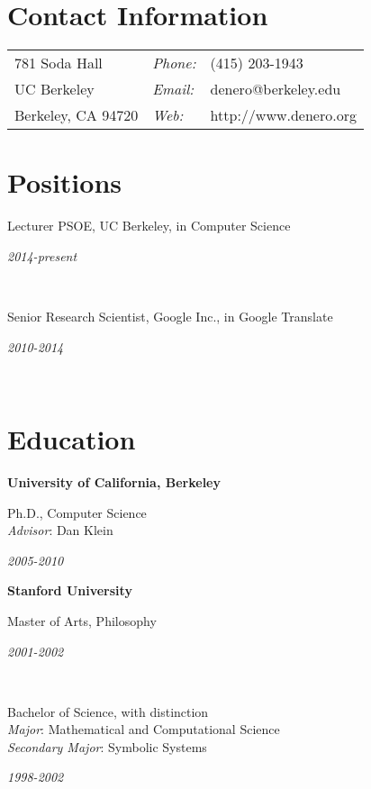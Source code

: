 \documentclass[margin,line]{res}
\newcommand{\dated}[2]{\parbox[t]{4.4in}{#1} \hspace{0.4in}
											 \parbox[t]{1in}{ {\it #2 } } }
\begin{document}

\begin{resume}

\section{\sc Contact Information}
\vspace{.05in}
\begin{tabular}{@{}p{2in}lp{4in}}
781 Soda Hall         & {\it Phone:} & (415) 203-1943        \\
UC Berkeley           & {\it Email:} & denero@berkeley.edu   \\
Berkeley, CA  94720   & {\it Web:}   & http://www.denero.org \\
\end{tabular}

\section{\sc Positions}

	\dated{Lecturer PSOE, UC Berkeley, in Computer Science}
	{ 2014-present } \\

	\dated{Senior Research Scientist, Google Inc., in Google Translate}
	{ 2010-2014 } \\

\section{\sc Education}

	{\bf University of California, Berkeley} \\
	\dated{Ph.D., Computer Science \\
	\hspace*{1em} {\it Advisor}: Dan Klein}{ 2005-2010 }

	{\bf Stanford University} \\
	\dated{Master of Arts, Philosophy\vspace{0.12in}}{ 2001-2002 } \\
	\dated{Bachelor of Science, with distinction \\
	\hspace*{1em} {\it Major}: Mathematical and Computational Science \\
	\hspace*{1em} {\it Secondary Major}: Symbolic Systems}{ 1998-2002 }


\end{resume}
\end{document}
